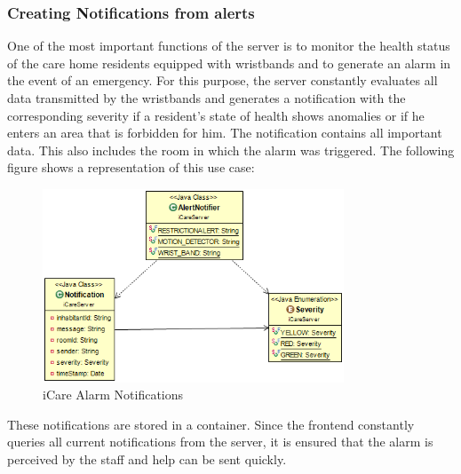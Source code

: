 \subsubsection{Creating Notifications from alerts}
One of the most important functions of the server is to monitor the health status of the care home residents equipped with wristbands and to generate an alarm in the event of an emergency. For this purpose, the server constantly evaluates all data transmitted by the wristbands and generates a notification with the corresponding severity if a resident's state of health shows anomalies or if he enters an area that is forbidden for him. The notification contains all important data. This also includes the room in which the alarm was triggered. The following figure shows a representation of this use case:
\begin{figure}[H]
	\centering
	\includegraphics[width =0.8\textwidth]{images/notification.png}
	\caption{iCare Alarm Notifications}
	\label{icare-notification}
\end{figure}
These notifications are stored in a container. Since the frontend constantly queries all current notifications from the server, it is ensured that the alarm is perceived by the staff and help can be sent quickly.
